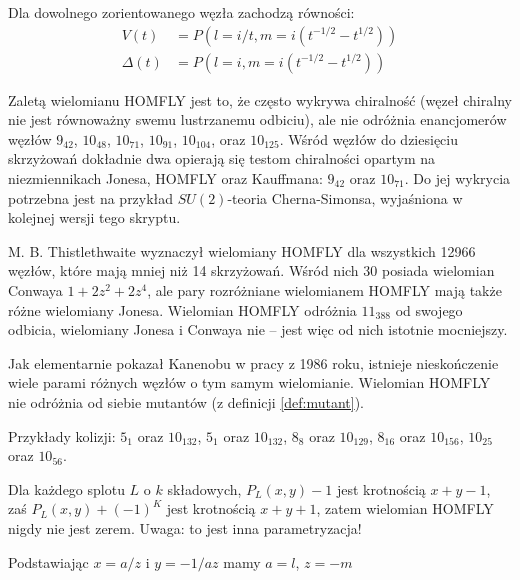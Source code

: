 \begin{proposition}
    Dla dowolnego zorientowanego węzła zachodzą równości:
        \begin{align*}
        V(t) & = P(l = i/t, m = i(t^{-1/2} - t^{1/2})) \\
        \Delta(t) & = P(l = i, m = i(t^{-1/2} - t^{1/2}))
    \end{align*}
\end{proposition}

Zaletą wielomianu HOMFLY jest to, że często wykrywa chiralność (węzeł chiralny nie jest równoważny swemu lustrzanemu odbiciu), ale nie odróżnia enancjomerów węzłów $9_{42}$, $10_{48}$, $10_{71}$, $10_{91}$, $10_{104}$, oraz $10_{125}$.
Wśród węzłów do dziesięciu skrzyżowań dokładnie dwa opierają się testom chiralności opartym na niezmiennikach Jonesa, HOMFLY oraz Kauffmana: $9_{42}$ oraz $10_{71}$.
Do jej wykrycia potrzebna jest na przykład $SU(2)$-teoria Cherna-Simonsa, wyjaśniona w kolejnej wersji tego skryptu.

M. B. Thistlethwaite wyznaczył wielomiany HOMFLY dla wszystkich 12966 węzłów, które mają mniej niż 14 skrzyżowań.
Wśród nich 30 posiada wielomian Conwaya $1 + 2z^2 + 2z^4$, ale pary rozróżniane wielomianem HOMFLY mają także różne wielomiany Jonesa.
Wielomian HOMFLY odróżnia $11_{388}$ od swojego odbicia, wielomiany Jonesa i Conwaya nie -- jest więc od nich istotnie mocniejszy.


Jak elementarnie pokazał Kanenobu w pracy \cite{kanenobu86} z 1986 roku, istnieje nieskończenie wiele parami różnych węzłów o tym samym wielomianie.
Wielomian HOMFLY nie odróżnia od siebie mutantów (z definicji \ref{def:mutant}).

\begin{example}
    Przykłady kolizji: $5_1$ oraz $10_{132}$, $5_{1}$ oraz $10_{132}$, 
    $8_{8}$ oraz $10_{129}$, $8_{16}$ oraz $10_{156}$, $10_{25}$ oraz $10_{56}$.
\end{example}




Dla każdego splotu $L$ o $k$ składowych, $P_L(x,y) - 1$ jest krotnością $x+y-1$, zaś $P_L(x,y) + (-1)^K$ jest krotnością $x +y + 1$, zatem wielomian HOMFLY nigdy nie jest zerem.
Uwaga: to jest inna parametryzacja!

Podstawiając $x = a/z$ i $y = -1/az$ mamy $a = l$, $z = -m$
